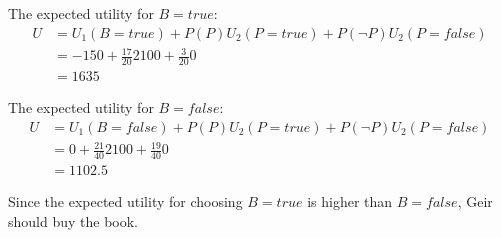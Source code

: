 \documentclass[11pt, a4paper, english]{../Template/NTNUoving}
\begin{document}
\begin{oppgave}
\begin{punkt}
        The expected utility for $B=true$:
        \begin{align*}
            U &= U_1(B=true) + P(P) U_2(P=true) + P(\neg P) U_2(P=false) \\
            &= -150 + \frac{17}{20} 2100 + \frac{3}{20} 0 \\
            &= 1635
        \end{align*}

        The expected utility for $B=false$:
        \begin{align*}
            U &= U_1(B=false) + P(P) U_2(P=true) + P(\neg P) U_2(P=false) \\
            &= 0 + \frac{21}{40} 2100 + \frac{19}{40} 0 \\
            &= 1102.5
        \end{align*}

        Since the expected utility for choosing $B=true$ is higher than $B=false$,
        Geir should buy the book.
    \end{punkt}
\end{oppgave}
\clearpage
\end{document}
